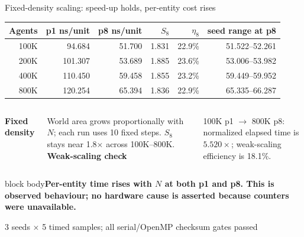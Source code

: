 \documentclass[aspectratio=169,10pt]{beamer}
\newcommand{\claim}[1]{\begin{beamercolorbox}[rounded=true,sep=.65em,wd=\linewidth]{block body}\centering\bfseries\color{moss}#1\end{beamercolorbox}}
\newcommand{\smallsource}[1]{\vfill\hfill{\scriptsize\color{muted}#1}}
\begin{document}
\begin{frame}{Fixed-density scaling: speed-up holds, per-entity cost rises}
\centering
{\renewcommand{\arraystretch}{.94}
\begin{tabular}{rrrrrr}
\toprule
Agents & p1 ns/unit & p8 ns/unit & $S_8$ & $\eta_8$ & seed range at p8 \\
\midrule
100K & 94.684 & 51.700 & 1.831 & 22.9\% & 51.522--52.261 \\
200K & 101.307 & 53.689 & 1.885 & 23.6\% & 53.006--53.982 \\
400K & 110.450 & 59.458 & 1.855 & 23.2\% & 59.449--59.952 \\
800K & 120.254 & 65.394 & 1.836 & 22.9\% & 65.335--66.287 \\
\bottomrule
\end{tabular}
}
\vspace{.25em}
\begin{columns}[T,onlytextwidth]
\textbf{Fixed density}\par
\small World area grows proportionally with $N$; each run uses 10 fixed steps. $S_8$ stays near 1.8$\times$ across 100K--800K.
\textbf{Weak-scaling check}\par
\small 100K p1 $\rightarrow$ 800K p8: normalized elapsed time is $5.520\times$; weak-scaling efficiency is 18.1\%.
\end{columns}
\vspace{.1em}
\claim{Per-entity time rises with $N$ at both p1 and p8. This is observed behaviour; no hardware cause is asserted because counters were unavailable.}
\smallsource{3 seeds $\times$ 5 timed samples; all serial/OpenMP checksum gates passed}
\end{frame}
\end{document}
